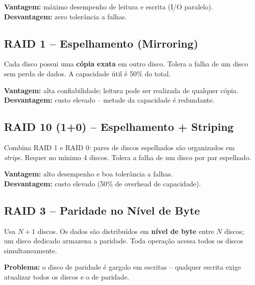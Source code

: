 \documentclass[12pt, a4paper]{article}
\begin{document}
\begin{caixaamarela}
  \textbf{Vantagem:} máximo desempenho de leitura e escrita (I/O paralelo).\\
  \textbf{Desvantagem:} zero tolerância a falhas.
\end{caixaamarela}

\subsection{RAID 1 -- Espelhamento (Mirroring)}

Cada disco possui uma \textbf{cópia exata} em outro disco. Tolera a falha de um
disco sem perda de dados. A capacidade útil é 50\% do total.

\begin{caixaamarela}
  \textbf{Vantagem:} alta confiabilidade; leitura pode ser realizada de qualquer cópia.\\
  \textbf{Desvantagem:} custo elevado -- metade da capacidade é redundante.
\end{caixaamarela}

\subsection{RAID 10 (1+0) -- Espelhamento + Striping}

Combina RAID 1 e RAID 0: pares de discos espelhados são organizados em \emph{stripe}.
Requer no mínimo 4 discos. Tolera a falha de um disco por par espelhado.

\begin{caixaamarela}
  \textbf{Vantagem:} alto desempenho e boa tolerância a falhas.\\
  \textbf{Desvantagem:} custo elevado (50\% de overhead de capacidade).
\end{caixaamarela}

\subsection{RAID 3 -- Paridade no Nível de Byte}

Usa $N+1$ discos. Os dados são distribuídos em \textbf{nível de byte} entre $N$ discos;
um disco dedicado armazena a paridade. Toda operação acessa todos os discos
simultaneamente.

\begin{caixaamarela}
  \textbf{Problema:} o disco de paridade é gargalo em escritas -- qualquer escrita
  exige atualizar todos os discos e o de paridade.
\end{caixaamarela}
\end{document}
